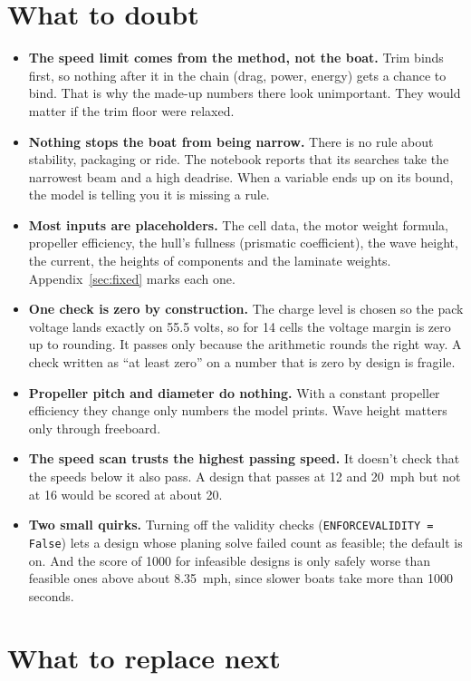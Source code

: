 \documentclass[11pt,a4paper]{article}
\renewcommand{\_}{\textunderscore\allowbreak}
\newcommand{\code}[1]{\texttt{#1}}
\begin{document}
\section*{What to doubt}
\label{sec:caveats}

\begin{itemize}
  \item \textbf{The speed limit comes from the method, not the boat.} Trim binds first, so nothing after it in the chain (drag, power, energy) gets a chance to bind. That is why the made-up numbers there look unimportant.
        They would matter if the trim floor were relaxed.
  \item \textbf{Nothing stops the boat from being narrow.} There is no rule about stability, packaging or ride. The notebook reports that its searches take the narrowest beam and a high deadrise. When a variable ends up on its bound,
        the model is telling you it is missing a rule.
  \item \textbf{Most inputs are placeholders.} The cell data, the motor weight formula, propeller efficiency, the hull's fullness (prismatic coefficient), the wave height, the current, the heights of components and the laminate weights.
        Appendix~\ref{sec:fixed} marks each one.
  \item \textbf{One check is zero by construction.} The charge level is chosen so the pack voltage lands exactly on 55.5 volts, so for 14 cells the voltage margin is zero up to rounding. It passes only because the arithmetic rounds the right way.
        A check written as ``at least zero'' on a number that is zero by design is fragile.
  \item \textbf{Propeller pitch and diameter do nothing.} With a constant propeller efficiency they change only numbers the model prints. Wave height matters only through freeboard.
  \item \textbf{The speed scan trusts the highest passing speed.} It doesn't check that the speeds below it also pass. A design that passes at 12 and 20~mph but not at 16 would be scored at about 20.
  \item \textbf{Two small quirks.} Turning off the validity checks (\code{ENFORCE\_VALIDITY = False}) lets a design whose planing solve failed count as feasible; the default is on. And the score of 1000 for infeasible designs
        is only safely worse than feasible ones above about 8.35~mph, since slower boats take more than 1000 seconds.
\end{itemize}

\section*{What to replace next}
\end{document}
